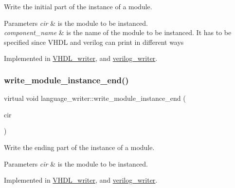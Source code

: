 Write the initial part of the instance of a module. 


\begin{DoxyParams}{Parameters}
{\em cir} & is the module to be instanced. \\
\hline
{\em component\+\_\+name} & is the name of the module to be instanced. It has to be specified since V\+H\+DL and verilog can print in different ways \\
\hline
\end{DoxyParams}


Implemented in \hyperlink{structVHDL__writer_ab73e2cc602653d648cb732dc34421854}{V\+H\+D\+L\+\_\+writer}, and \hyperlink{classverilog__writer_a1e0cb32347eba52c36780f6f179dfa6c}{verilog\+\_\+writer}.

\mbox{\label{classlanguage__writer_a58bc0c17545d1fc96385a5fbffbe62b2}} 
\subsubsection{\texorpdfstring{write\+\_\+module\+\_\+instance\+\_\+end()}{write\_module\_instance\_end()}}
{\footnotesize\ttfamily virtual void language\+\_\+writer\+::write\+\_\+module\+\_\+instance\+\_\+end (\begin{DoxyParamCaption}\item[{const \hyperlink{structural__objects_8hpp_a8ea5f8cc50ab8f4c31e2751074ff60b2}{structural\+\_\+object\+Ref} \&}]{cir }\end{DoxyParamCaption})\hspace{0.3cm}{\ttfamily [pure virtual]}}



Write the ending part of the instance of a module. 


\begin{DoxyParams}{Parameters}
{\em cir} & is the module to be instanced. \\
\hline
\end{DoxyParams}


Implemented in \hyperlink{structVHDL__writer_a8aac905135d17dd707703da3b73dd6d5}{V\+H\+D\+L\+\_\+writer}, and \hyperlink{classverilog__writer_ac10a9da13d7ad6c60d862998383a3695}{verilog\+\_\+writer}.

